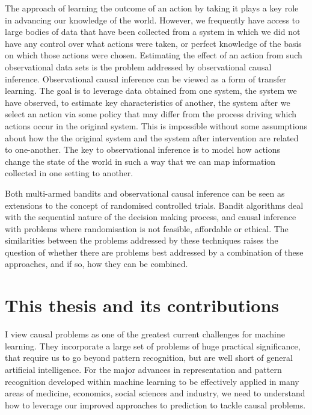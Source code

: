 \documentclass[11pt,a4paper,twoside]{report}
\theoremstyle{plain}
\theoremstyle{definition}
\begin{document}
The approach of learning the outcome of an action by taking it plays a key role in advancing our knowledge of the world. However, we frequently have access to large bodies of data that have been collected from a system in which we did not have any control over what actions were taken, or perfect knowledge of the basis on which those actions were chosen. Estimating the effect of an action from such observational data sets is the problem addressed by observational causal inference. Observational causal inference can be viewed as a form of transfer learning. The goal is to leverage data obtained from one system, the system we have observed, to estimate key characteristics of another, the system after we select an action via some policy that may differ from the process driving which actions occur in the original system. This is impossible without some assumptions about how the the original system and the system after intervention are related to one-another. The key to observational inference is to model how actions change the state of the world in such a way that we can map information collected in one setting to another. 

Both multi-armed bandits and observational causal inference can be seen as extensions to the concept of randomised controlled trials. Bandit algorithms deal with the sequential nature of the decision making process, and causal inference with problems where randomisation is not feasible, affordable or ethical. The similarities between the problems addressed by these techniques raises the question of whether there are problems best addressed by a combination of these approaches, and if so, how they can be combined. 

\section{This thesis and its contributions}

I view causal problems as one of the greatest current challenges for machine learning. They incorporate a large set of problems of huge practical significance, that require us to go beyond pattern recognition, but are well short of general artificial intelligence. For the major advances in representation and pattern recognition developed within machine learning to be effectively applied in many areas of medicine, economics, social sciences and industry, we need to understand how to leverage our improved approaches to prediction to tackle causal problems. 
\end{document}
